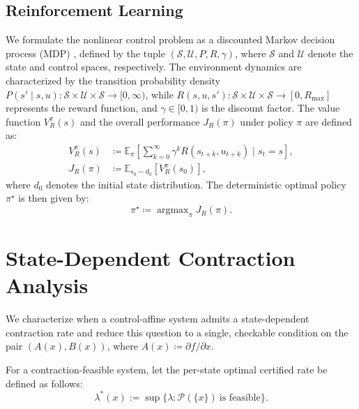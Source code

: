 \documentclass[lettersize,journal]{IEEEtran}
\DeclareMathOperator*{\argmax}{argmax}
\begin{document}
\subsection{Reinforcement Learning}
We formulate the nonlinear control problem as a discounted Markov decision process (MDP) \cite{puterman2014markov}, defined by the tuple $(\mathcal{S}, \mathcal{U}, P, R, \gamma)$, where $\mathcal{S}$ and $\mathcal{U}$ denote the state and control spaces, respectively. 
The environment dynamics are characterized by the transition probability density $P(s' \mid s, u): \mathcal{S} \times \mathcal{U} \times \mathcal{S} \rightarrow [0, \infty)$, while $R(s, u, s') : \mathcal{S} \times \mathcal{U} \times \mathcal{S} \rightarrow [0, R_{\max}]$ represents the reward function, and $\gamma \in [0,1)$ is the discount factor. 
The value function $V_{R}^{\pi}(s)$ and the overall performance $J_{R}(\pi)$ under policy $\pi$ are defined as:
\begin{align}
    V_{R}^{\pi}(s) & \coloneq \mathbb{E}_\pi \left[ \sum_{k=0}^{\infty} \gamma^k R(s_{t + k}, u_{t+k}) \mid s_t = s \right], \label{eqn:reward_value_function}\\
    J_{R}(\pi) & \coloneq \mathbb{E}_{s_0 \sim d_0}\left[ V_{R}^{\pi}(s_0) \right], \label{eqn:reward_performance}
\end{align}
where $d_0$ denotes the initial state distribution. 
The deterministic optimal policy $\pi^\star$ is then given by:
\begin{equation}\label{eqn:discounted_optimal_policy}
    \pi^\star \coloneq \argmax_\pi J_{R}(\pi).
\end{equation}


\section{State-Dependent Contraction Analysis}\label{sec:state_dependent_rate}
We characterize when a control-affine system admits a state-dependent
contraction rate and reduce this question to a single, checkable condition on
the pair $(A(x),B(x))$, where $A(x)\coloneq\partial f/\partial x$.

For a contraction-feasible system, let the per-state optimal certified rate be defined as follows:
\begin{equation}\label{eq:lambda_star_x}
    \lambda^*(x) := \sup \bigl\{ \lambda : \mathcal{P}(\{x\})\ \text{is feasible} \bigr\}.
\end{equation}
\end{document}
